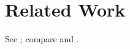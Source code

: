 \section[Related Work]{Related Work}\label{sec:related}
See \textcite{alpha}; compare \citeauthor{alpha} \citeyearpar{alpha} and \parencite[see][pp.~1--2]{beta}.
